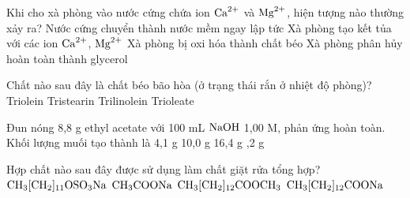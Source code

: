\documentclass[11pt,a4paper]{article}
\begin{document}
\begin{ex}
Khi cho xà phòng vào nước cứng chứa ion $\ce{Ca^2+}$ và $\ce{Mg^2+}$, hiện tượng nào thường xảy ra?
\choice
{Nước cứng chuyển thành nước mềm ngay lập tức}
{\True Xà phòng tạo kết tủa với các ion $\ce{Ca^2+}$, $\ce{Mg^2+}$}
{Xà phòng bị oxi hóa thành chất béo}
{Xà phòng phân hủy hoàn toàn thành glycerol}



\end{ex}

\begin{ex}
Chất nào sau đây là chất béo bão hòa (ở trạng thái rắn ở nhiệt độ phòng)?
\choice
{Triolein}
{\True Tristearin}
{Trilinolein}
{Trioleate}



\end{ex}

\begin{ex}
Đun nóng 8,8 g ethyl acetate với 100 mL $\ce{NaOH}$ 1,00 M, phản ứng hoàn toàn. Khối lượng muối tạo thành là
\choice
{4,1 g}
{10,0 g}
{16,4 g}
{,2 g}



\end{ex}

\begin{ex}
Hợp chất nào sau đây được sử dụng làm chất giặt rửa tổng hợp?
\choice
{\True $\ce{CH3[CH2]11OSO3Na}$}
{$\ce{CH3COONa}$}
{$\ce{CH3[CH2]12COOCH3}$}
{$\ce{CH3[CH2]12COONa}$}



\end{ex}
\end{document}
